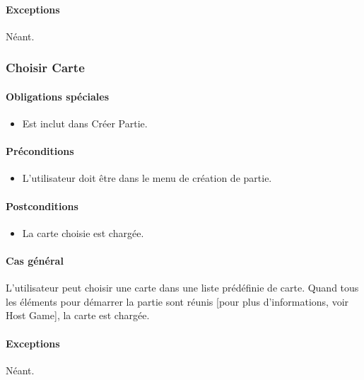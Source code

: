 \documentclass[a4paper,11pt]{report}
\begin{document}
\paragraph{Exceptions} Néant.

\newpage
\subsubsection{Choisir Carte}
\paragraph{Obligations spéciales}
\begin{itemize}
 \item Est inclut dans Créer Partie.
\end{itemize}
\paragraph{Préconditions}
\begin{itemize}
 \item L'utilisateur doit être dans le menu de création de partie.
\end{itemize}
\paragraph{Postconditions}
\begin{itemize}
 \item La carte choisie est chargée.
\end{itemize}
\paragraph{Cas général}
L'utilisateur peut choisir une carte dans une liste prédéfinie de carte. Quand tous les éléments pour démarrer la partie
sont réunis [pour plus d'informations, voir Host Game], la carte est chargée.
\paragraph{Exceptions} Néant.

\newpage
\end{document}
